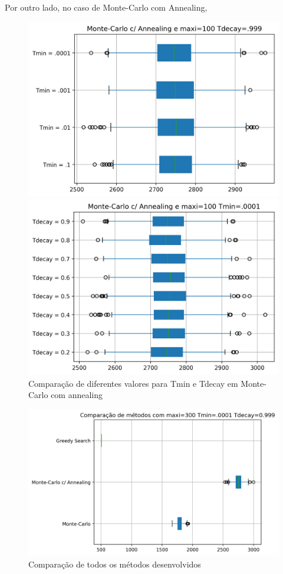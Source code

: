 \documentclass[a4paper]{report}
\begin{document}
Por outro lado, no caso de Monte-Carlo com Annealing,


\begin{figure}[h]
\centering
\begin{minipage}{.5\textwidth}
  \centering
  \includegraphics[width=.95\linewidth]{images/graph_comp_tmin_sa.png}
\end{minipage}%
\begin{minipage}{.5\textwidth}
  \centering
  \includegraphics[width=.95\linewidth]{images/graph_comp_tdecay_sa.png}
\end{minipage}
    \caption{Comparação de diferentes valores para Tmin e Tdecay em Monte-Carlo com annealing}
\end{figure}

\begin{figure}[h]
    \centering
        \includegraphics[width=\textwidth]{images/graph_comp_all_algorithms.png}
        \caption{Comparação de todos os métodos desenvolvidos}
\end{figure}
\end{document}
